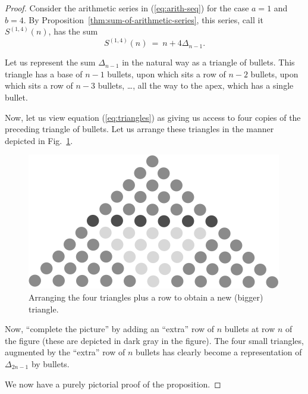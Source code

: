 \begin{proof} 
Consider the arithmetic series in (\ref{eq:arith-seq}) for the case
$a=1$ and $b=4$.  By Proposition~\ref{thm:sum-of-arithmetic-series},
this series, call it $S^{(1,4)}(n)$, has the sum
\begin{equation}
\label{eq:triangles}
S^{(1,4)}(n) \ = \ n + 4 \Delta_{n-1}.
\end{equation}

Let us represent the sum $\Delta_{n-1}$ in the natural way as a
triangle of bullets.  This triangle has a base of $n-1$ bullets, upon
which sits a row of $n-2$ bullets, upon which sits a row of $n-3$
bullets, \ldots, all the way to the apex, which has a single bullet.

Now, let us view equation (\ref{eq:triangles}) as giving us access to four
copies of the preceding triangle of bullets.  Let us arrange these
triangles in the manner depicted in Fig.~\ref{fig:Delta(n)4}.
\begin{figure}[ht]
\begin{center}
       \includegraphics[scale=0.5]{FiguresMaths/Delta4}
 \caption{Arranging the four triangles plus a row to obtain a new (bigger) triangle.}
       \label{fig:Delta(n)4}
\end{center}
\end{figure}
Now, ``complete the picture'' by adding an ``extra'' row of $n$
bullets at row $n$ of the figure (these are depicted in dark gray in
the figure).  The four small triangles, augmented by the ``extra'' row
of $n$ bullets has clearly become a representation  of $\Delta_{2n-1}$
by bullets.

We now have a purely pictorial proof of the proposition.
\end{proof} 

